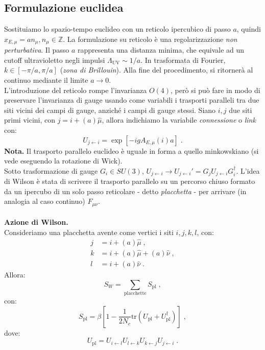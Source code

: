 \documentclass[12pt,a4paper]{article}
\theoremstyle{definition}
\newcommand{\adj}[1]{#1^{\dagger}}
\newcommand{\tr}{\mathrm{tr}}
\numberwithin{equation}{section}
\begin{document}
\subsection{Formulazione euclidea}
Sostituiamo lo spazio-tempo euclideo con un reticolo ipercubico di passo $a$, quindi $x_{E,\mu}=an_{\mu},n_{\mu}\in \mathbb{Z}$. La formulazione su reticolo è una regolarizzazione \emph{non perturbativa}. Il passo $a$ rappresenta una distanza minima, che equivale ad un cutoff ultravioletto negli impulsi $\Lambda_{\mathrm{UV}}\sim 1/a$. In trasformata di Fourier, $k\in [-\pi/a,\pi/a]$ (\emph{zona di Brillouin}). Alla fine del procedimento, si ritornerà al continuo mediante il limite $a\to 0$. \\
L'introduzione del reticolo rompe l'invarianza $O(4)$, però si può fare in modo di preservare l'invarianza di gauge usando come variabili i trasporti paralleli tra due siti vicini dei campi di gauge, anziché i campi di gauge stessi. Siano $i,j$ due siti primi vicini, con $j=i+(a)\hat{\mu}$, allora indichiamo la variabile \emph{connessione} o \emph{link} con:
\begin{equation}
U_{j\leftarrow i}=\exp[-igA_{E,\mu}(i)a]\;.
\end{equation}
\textbf{Nota.} Il trasporto parallelo euclideo è uguale in forma a quello minkowskiano (si vede eseguendo la rotazione di Wick). \\
Sotto trasformazione di gauge $G_i\in SU(3)$, $U_{j\leftarrow i}\longrightarrow U_{j\leftarrow i}'=G_jU_{j\leftarrow i}\adj{G}_i$. L'idea di Wilson è stata di scrivere il trasporto parallelo su un percorso chiuso formato da un ipercubo di un solo passo reticolare - detto \emph{placchetta} - per arrivare (in analogia al caso continuo) $F_{\mu\nu}$. \\
\\
\textbf{Azione di Wilson.} \\
Consideriamo una placchetta avente come vertici i siti $i,j,k,l$, con:
\begin{align*}
j &= i+(a)\hat{\mu}\;, \\
k &= i+(a)\hat{\mu}+(a)\hat{\nu}\;, \\
l &= i+(a)\hat{\nu}\;.
\end{align*}
Allora:
$$
S_W=\sum_{\mathrm{placchette}}S_{\mathrm{pl}}\;,
$$ 
con:
\begin{equation}
S_{\mathrm{pl}}=\beta\left[1-\frac{1}{2N_c}\tr\left(U_{\mathrm{pl}}+\adj{U}_{\mathrm{pl}}\right)\right]\;,
\end{equation}
dove:
\begin{equation}
U_{\mathrm{pl}}=U_{i\leftarrow l}U_{l\leftarrow k}U_{k\leftarrow j}U_{j\leftarrow i}\;.
\end{equation}
\end{document}
